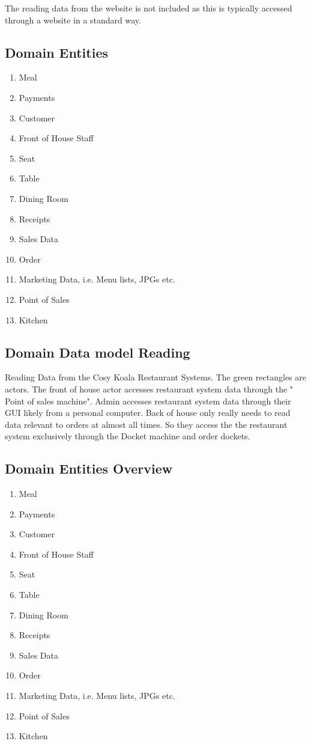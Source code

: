 \documentclass{article}
\begin{document}
The reading data from the website is not included as this is typically accessed through a website in a standard way.

\subsection{Domain Entities}
\begin{enumerate}
    \item Meal
    \item Payments
    \item Customer
    \item Front of House Staff
    \item Seat
    \item Table
    \item Dining Room
    \item Receipts
    \item Sales Data
    \item Order
    \item Marketing Data, i.e. Menu lists, JPGs etc.
    \item Point of Sales
    \item Kitchen
\end{enumerate}

\clearpage
\subsection{ Domain Data model Reading}
Reading Data from the Cosy Koala Restaurant Systems. The green rectangles are actors.
The front of house actor accesses restaurant system data through the " Point of sales machine".
Admin accesses restaurant system data through their GUI likely from a personal computer.
Back of house only really needs to read data relevant to orders at almost all times. So they access the the restaurant system exclusively through the Docket machine and order dockets.

\subsection{Domain Entities Overview}
\begin{enumerate}
    \item Meal
    \item Payments
    \item Customer
    \item Front of House Staff
    \item Seat
    \item Table
    \item Dining Room
    \item Receipts
    \item Sales Data
    \item Order
    \item Marketing Data, i.e. Menu lists, JPGs etc.
    \item Point of Sales
    \item Kitchen
\end{enumerate}
\end{document}
